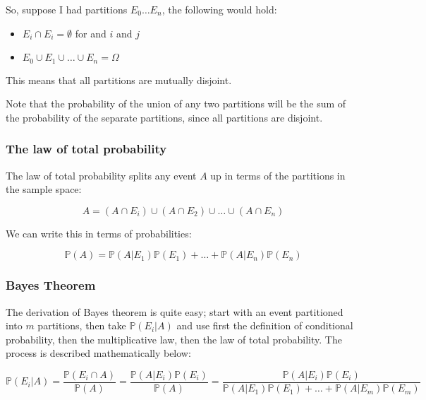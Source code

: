 So, suppose I had partitions $E_0 \dots E_n$, the following would hold:

\begin{itemize}
	\item $E_i \cap E_i = \emptyset$ for and $i$ and $j$
	\item $E_0 \cup E_1 \cup \dots \cup E_n = \Omega$
\end{itemize}

This means that all partitions are mutually disjoint.


Note that the probability of the union of any two partitions will be the sum of
the probability of the separate partitions, since all partitions are disjoint.

\subsubsection{The law of total probability}

The law of total probability splits any event $A$ up in terms of the partitions
in the sample space:

\begin{dmath*}
	A = (A \cap E_i) \cup (A \cap E_2) \cup \dots \cup (A \cap E_n)
\end{dmath*}

We can write this in terms of probabilities:

\begin{dmath*}
	\mathbb{P}(A) = \mathbb{P}(A|E_1)\mathbb{P}(E_1) + \dots + \mathbb{P}(A|E_n)\mathbb{P}(E_n)
\end{dmath*}

\subsubsection{Bayes Theorem}

The derivation of Bayes theorem is quite easy; start with an event partitioned
into $m$ partitions, then take $\mathbb{P}(E_i|A)$ and use first the definition
of conditional probability, then the multiplicative law, then the law of total
probability. The process is described mathematically below:

\begin{dmath*}
	\mathbb{P}(E_i|A) = \frac{\mathbb{P}(E_i \cap A)}{\mathbb{P}(A)} = \frac{\mathbb{P}(A|E_i)\mathbb{P}(E_i)}{\mathbb{P}(A)} = \frac{\mathbb{P}(A|E_i)\mathbb{P}(E_i)}{\mathbb{P}(A|E_1)\mathbb{P}(E_1) + \dots + \mathbb{P}(A|E_m)\mathbb{P}(E_m)}
\end{dmath*}

